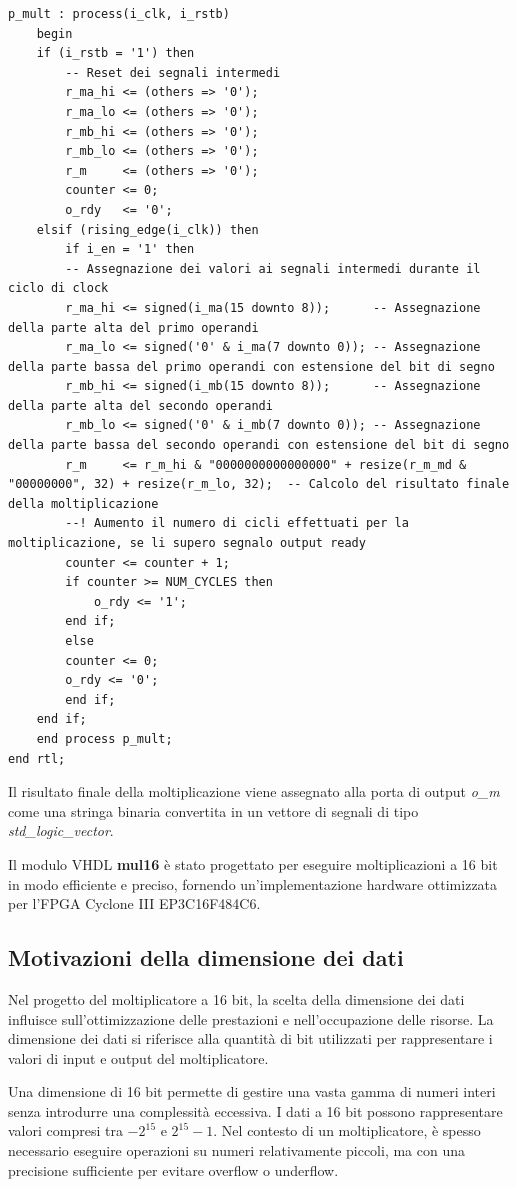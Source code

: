 \documentclass[titlepage]{report}
\begin{document}
\begin{lstlisting}[caption={\textbf{mul16.vhd} - architettura del motiplicatore a 16 bit}, label={lst:mul16_process}]
	p_mult : process(i_clk, i_rstb)
	begin
	if (i_rstb = '1') then
		-- Reset dei segnali intermedi
		r_ma_hi <= (others => '0');
		r_ma_lo <= (others => '0');
		r_mb_hi <= (others => '0');
		r_mb_lo <= (others => '0');
		r_m     <= (others => '0');
		counter <= 0;
		o_rdy   <= '0';
	elsif (rising_edge(i_clk)) then
		if i_en = '1' then
		-- Assegnazione dei valori ai segnali intermedi durante il ciclo di clock
		r_ma_hi <= signed(i_ma(15 downto 8));      -- Assegnazione della parte alta del primo operandi
		r_ma_lo <= signed('0' & i_ma(7 downto 0)); -- Assegnazione della parte bassa del primo operandi con estensione del bit di segno
		r_mb_hi <= signed(i_mb(15 downto 8));      -- Assegnazione della parte alta del secondo operandi
		r_mb_lo <= signed('0' & i_mb(7 downto 0)); -- Assegnazione della parte bassa del secondo operandi con estensione del bit di segno
		r_m     <= r_m_hi & "0000000000000000" + resize(r_m_md & "00000000", 32) + resize(r_m_lo, 32);  -- Calcolo del risultato finale della moltiplicazione
		--! Aumento il numero di cicli effettuati per la moltiplicazione, se li supero segnalo output ready
		counter <= counter + 1;
		if counter >= NUM_CYCLES then
			o_rdy <= '1';
		end if;
		else
		counter <= 0;
		o_rdy <= '0';
		end if;
	end if;
	end process p_mult;
end rtl;
		\end{lstlisting}
		
		Il risultato finale della moltiplicazione viene assegnato alla porta di output \textit{o\_m} come una stringa binaria convertita in un vettore di segnali di tipo \textit{std\_logic\_vector}.
		
		Il modulo VHDL \textbf{mul16} è stato progettato per eseguire moltiplicazioni a 16 bit in modo efficiente e preciso, fornendo un'implementazione hardware ottimizzata per l'FPGA Cyclone III EP3C16F484C6.
		
		\subsection{Motivazioni della dimensione dei dati}
		\label{subsec:scelta_dimensione_dati}
			Nel progetto del moltiplicatore a 16 bit, la scelta della dimensione dei dati influisce sull'ottimizzazione delle prestazioni e nell'occupazione delle risorse. La dimensione dei dati si riferisce alla quantità di bit utilizzati per rappresentare i valori di input e output del moltiplicatore.

			Una dimensione di 16 bit permette di gestire una vasta gamma di numeri interi senza introdurre una complessità eccessiva. I dati a 16 bit possono rappresentare valori compresi tra $-2^{15}$ e $2^{15}-1$. Nel contesto di un moltiplicatore, è spesso necessario eseguire operazioni su numeri relativamente piccoli, ma con una precisione sufficiente per evitare overflow o underflow.
\end{document}
